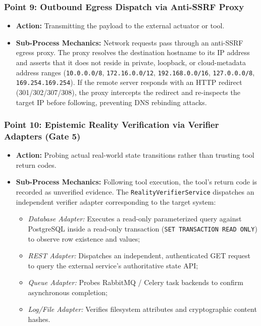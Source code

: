 \documentclass[11pt,a4paper]{article}
\begin{document}
\subsubsection*{Point 9: Outbound Egress Dispatch via Anti-SSRF Proxy}
\begin{itemize}[leftmargin=*,itemsep=1pt]
  \item \textbf{Action:} Transmitting the payload to the external actuator or tool.
  \item \textbf{Sub-Process Mechanics:} Network requests pass through an anti-SSRF egress proxy. The proxy resolves the destination hostname to its IP address and asserts that it does not reside in private, loopback, or cloud-metadata address ranges (\texttt{10.0.0.0/8}, \texttt{172.16.0.0/12}, \texttt{192.168.0.0/16}, \texttt{127.0.0.0/8}, \texttt{169.254.169.254}). If the remote server responds with an HTTP redirect (301/302/307/308), the proxy intercepts the redirect and re-inspects the target IP before following, preventing DNS rebinding attacks.
\end{itemize}

\subsubsection*{Point 10: Epistemic Reality Verification via Verifier Adapters (Gate 5)}
\begin{itemize}[leftmargin=*,itemsep=1pt]
  \item \textbf{Action:} Probing actual real-world state transitions rather than trusting tool return codes.
  \item \textbf{Sub-Process Mechanics:} Following tool execution, the tool's return code is recorded as unverified evidence. The \texttt{RealityVerifierService} dispatches an independent verifier adapter corresponding to the target system:
    \begin{itemize}[leftmargin=*,itemsep=1pt]
      \item \emph{Database Adapter:} Executes a read-only parameterized query against PostgreSQL inside a read-only transaction (\texttt{SET TRANSACTION READ ONLY}) to observe row existence and values;
      \item \emph{REST Adapter:} Dispatches an independent, authenticated GET request to query the external service's authoritative state API;
      \item \emph{Queue Adapter:} Probes RabbitMQ / Celery task backends to confirm asynchronous completion;
      \item \emph{Log/File Adapter:} Verifies filesystem attributes and cryptographic content hashes.
    \end{itemize}
\end{itemize}
\end{document}
